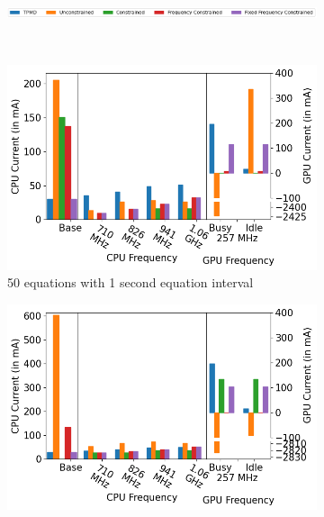 \begin{figure}[tb]
    \centering
    \begin{subfigure}[b]{0.75\textwidth}
         \centering
         \includegraphics[width=\textwidth]{figures/label_equations.png}
    \end{subfigure}
    \\
    \hfill
    \centering
     \begin{subfigure}[b]{0.32\textwidth}
         \centering
         \includegraphics[width=\textwidth]{figures/004_Pixel4_bricksbreaker_menu_50_1_equations.png}
         \caption{50 equations with 1 second equation interval}
         \label{fig:macro_3_ways_50_1}
     \end{subfigure}
    \begin{subfigure}[b]{0.32\textwidth}
         \centering
         \includegraphics[width=\textwidth]{figures/004_Pixel4_bricksbreaker_menu_250_1_equations.png}

\end{subfigure}
\end{figure}
